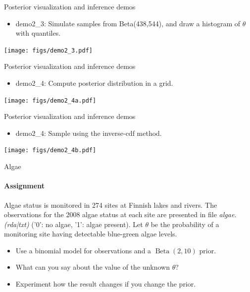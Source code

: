 \documentclass[english,t]{beamer}
\DeclareMathOperator{\Beta}{Beta}
\begin{document}

\begin{frame}{Posterior visualization and inference demos}

  \begin{itemize}
  \item demo2\_3: Simulate samples from Beta(438,544), and draw
    a histogram of $\theta$ with quantiles.
  \end{itemize}
  \vspace{-\baselineskip}
  \begin{center}
    \texttt{[image: figs/demo2\_3.pdf]}
  \end{center}
\end{frame}

\begin{frame}{Posterior visualization and inference demos}

  \begin{itemize}
  \item demo2\_4: Compute posterior distribution in a grid.
  \end{itemize}
  \texttt{[image: figs/demo2\_4a.pdf]}
\end{frame}

\begin{frame}{Posterior visualization and inference demos}

  \begin{itemize}
  \item demo2\_4: Sample using the inverse-cdf method.
  \end{itemize}
  \texttt{[image: figs/demo2\_4b.pdf]}
\end{frame}

\begin{frame}{Algae}
  \framesubtitle{Assignment}

  Algae status is monitored in 274 sites at Finnish lakes and rivers. 
  The observations for the 2008 algae status at each site are presented
  in file \emph{algae.(rda|txt)} ('0': no algae, '1': algae present). 
  Let $\theta$ be the probability of a monitoring site having detectable
  blue-green algae levels. 

  \begin{itemize}
  \item Use a binomial model for observations and a $\Beta(2,10)$ prior.
  \item What can you say about the value of the unknown $\theta$?
  \item Experiment how the result changes if you change the prior.
  \end{itemize}

\end{frame}
\end{document}
